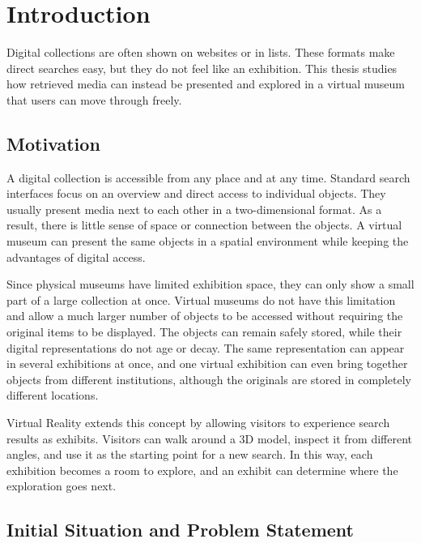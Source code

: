 \chapter{Introduction}
\label{ch:introduction}

\begingroup
\setaftersecskip{6pt}
\setlength{\emergencystretch}{2em}
Digital collections are often shown on websites or in lists. These formats make direct searches easy, but they do not feel like an exhibition. This thesis studies how retrieved media can instead be presented and explored in a virtual museum that users can move through freely.

\section{Motivation}
\label{sec:introduction-motivation}

A digital collection is accessible from any place and at any time. Standard search interfaces focus on an overview and direct access to individual objects. They usually present media next to each other in a two-dimensional format. As a result, there is little sense of space or connection between the objects. A virtual museum can present the same objects in a spatial environment while keeping the advantages of digital access.

Since physical museums have limited exhibition space, they can only show a small part of a large collection at once. Virtual museums do not have this limitation and allow a much larger number of objects to be accessed without requiring the original items to be displayed. The objects can remain safely stored, while their digital representations do not age or decay. The same representation can appear in several exhibitions at once, and one virtual exhibition can even bring together objects from different institutions, although the originals are stored in completely different locations.

Virtual Reality extends this concept by allowing visitors to experience search results as exhibits. Visitors can walk around a 3D model, inspect it from different angles, and use it as the starting point for a new search. In this way, each exhibition becomes a room to explore, and an exhibit can determine where the exploration goes next.

\enlargethispage{\baselineskip}
\section{Initial Situation and Problem Statement}
\label{sec:introduction-problem}

